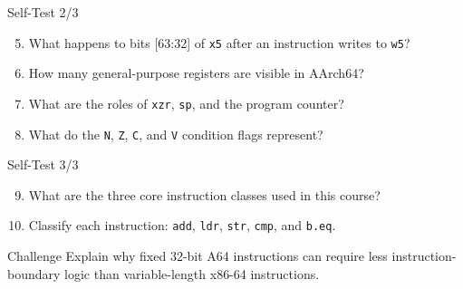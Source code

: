 \documentclass[aspectratio=169,11pt,t]{beamer}
\newcommand{\code}[1]{\texttt{#1}}
\begin{document}
\begin{frame}{Self-Test 2/3}

\begin{enumerate}
\setcounter{enumi}{4}
  \item What happens to bits [63:32]
        of \code{x5}
        after an instruction writes to \code{w5}?
  \item How many general-purpose registers
        are visible in AArch64?
  \item What are the roles of
        \code{xzr},
        \code{sp},
        and the program counter?
  \item What do the
        \code{N},
        \code{Z},
        \code{C},
        and
        \code{V}
        condition flags represent?
\end{enumerate}

\end{frame}




\begin{frame}{Self-Test 3/3}

\begin{enumerate}
\setcounter{enumi}{8}
  \item What are the three core
        instruction classes
        used in this course?
  \item Classify each instruction:
        \code{add},
        \code{ldr},
        \code{str},
        \code{cmp},
        and
        \code{b.eq}.
\end{enumerate}

\vspace{0.15cm}

\begin{block}{Challenge}
Explain why fixed 32-bit A64 instructions
can require less instruction-boundary logic
than variable-length x86-64 instructions.
\end{block}

\end{frame}



\end{document}

